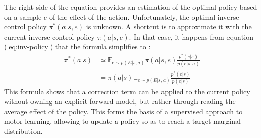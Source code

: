 \documentclass[runningheads]{llncs}
\begin{document}
The right side of the equation provides an estimation of the optimal policy based on a sample $e$ of the effect of the action. Unfortunately, the optimal inverse control policy $\pi^*(a|s,e)$ is unknown. A shortcut is to approximate it with the current inverse control policy $\pi(a|s,e)$.
In that case, it happens from equation (\ref{eq:inv-policy}) that the formula simplifies to :
\begin{align}\label{eq:bayesian-update}
\pi^*(a|s) &\simeq \mathbb{E}_{e\sim p(E|s,a)} \pi(a|s,e)\frac{p^*(e|s)}{p(e|s,a)}\\
&= \pi(a|s) \mathbb{E}_{e\sim p(E|s,a)} \frac{p^*(e|s)}{p(e|s)}
\end{align}
This formula shows that a correction term can be applied to the current policy without owning an explicit forward model, but rather through reading the average effect of the policy. This forms the basis of a supervised approach to motor learning, allowing to update a policy so as to reach a target marginal distribution. 

%
%
%
\end{document}

